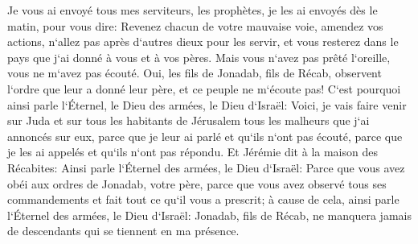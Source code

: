 \verse Je vous ai envoyé tous mes serviteurs, les prophètes, je les ai envoyés dès le matin, pour vous dire: Revenez chacun de votre mauvaise voie, amendez vos actions, n`allez pas après d`autres dieux pour les servir, et vous resterez dans le pays que j`ai donné à vous et à vos pères. Mais vous n`avez pas prêté l`oreille, vous ne m`avez pas écouté. 
\verse Oui, les fils de Jonadab, fils de Récab, observent l`ordre que leur a donné leur père, et ce peuple ne m`écoute pas! 
\verse C`est pourquoi ainsi parle l`Éternel, le Dieu des armées, le Dieu d`Israël: Voici, je vais faire venir sur Juda et sur tous les habitants de Jérusalem tous les malheurs que j`ai annoncés sur eux, parce que je leur ai parlé et qu`ils n`ont pas écouté, parce que je les ai appelés et qu`ils n`ont pas répondu. 
\verse Et Jérémie dit à la maison des Récabites: Ainsi parle l`Éternel des armées, le Dieu d`Israël: Parce que vous avez obéi aux ordres de Jonadab, votre père, parce que vous avez observé tous ses commandements et fait tout ce qu`il vous a prescrit; 
\verse à cause de cela, ainsi parle l`Éternel des armées, le Dieu d`Israël: Jonadab, fils de Récab, ne manquera jamais de descendants qui se tiennent en ma présence. 

